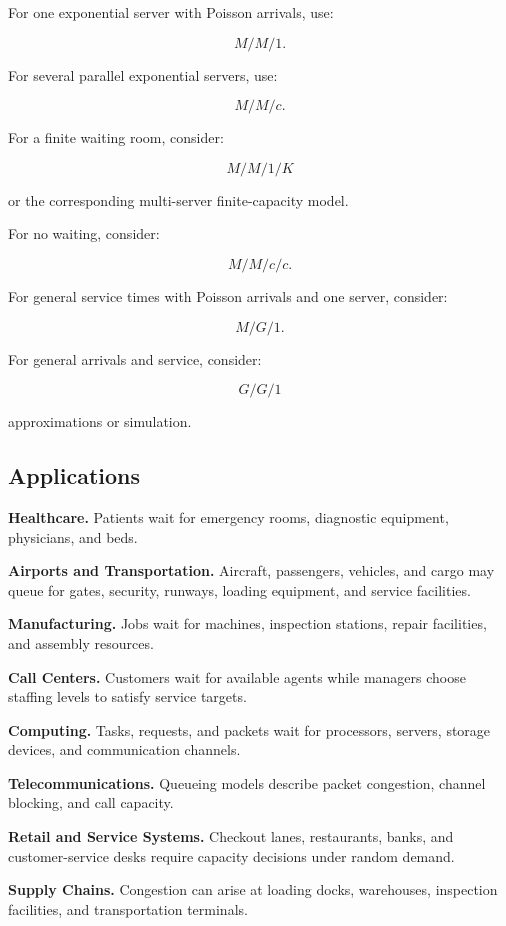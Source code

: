 For one exponential server with Poisson arrivals, use:

\[
\boxed{
M/M/1.
}
\]

For several parallel exponential servers, use:

\[
\boxed{
M/M/c.
}
\]

For a finite waiting room, consider:

\[
\boxed{
M/M/1/K
}
\]

or the corresponding multi-server finite-capacity model.

For no waiting, consider:

\[
\boxed{
M/M/c/c.
}
\]

For general service times with Poisson arrivals and one server, consider:

\[
\boxed{
M/G/1.
}
\]

For general arrivals and service, consider:

\[
\boxed{
G/G/1
}
\]

approximations or simulation.

\subsection{Applications}
\label{subsec:queueing-applications}

\begin{applicationbox}

\textbf{Healthcare.}
Patients wait for emergency rooms, diagnostic equipment, physicians, and
beds.

\medskip

\textbf{Airports and Transportation.}
Aircraft, passengers, vehicles, and cargo may queue for gates, security,
runways, loading equipment, and service facilities.

\medskip

\textbf{Manufacturing.}
Jobs wait for machines, inspection stations, repair facilities, and
assembly resources.

\medskip

\textbf{Call Centers.}
Customers wait for available agents while managers choose staffing levels
to satisfy service targets.

\medskip

\textbf{Computing.}
Tasks, requests, and packets wait for processors, servers, storage devices,
and communication channels.

\medskip

\textbf{Telecommunications.}
Queueing models describe packet congestion, channel blocking, and call
capacity.

\medskip

\textbf{Retail and Service Systems.}
Checkout lanes, restaurants, banks, and customer-service desks require
capacity decisions under random demand.

\medskip

\textbf{Supply Chains.}
Congestion can arise at loading docks, warehouses, inspection facilities,
and transportation terminals.

\end{applicationbox}

